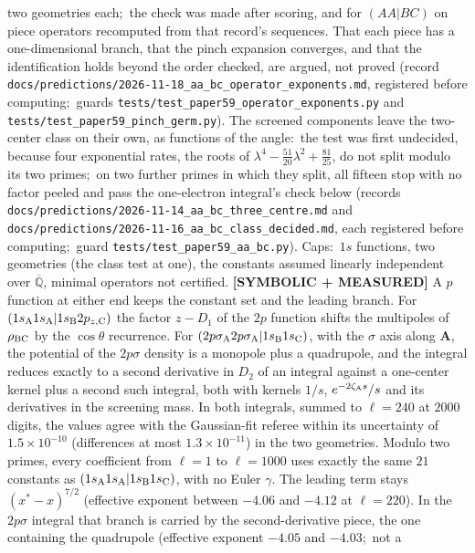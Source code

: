 \documentclass[aps,pra,twocolumn,superscriptaddress,longbibliography]{revtex4-2}
\begin{document}
two geometries each;\ the check was made after scoring, and for $(AA|BC)$ on piece operators
recomputed from that record's sequences.  That each piece has a one-dimensional branch, that the pinch expansion converges, and that
the identification holds beyond the order checked, are argued, not proved (record
\texttt{docs/predictions/2026-11-18\_aa\_bc\_operator\_exponents.md}, registered before computing;\ guards
\texttt{tests/test\_paper59\_operator\_exponents.py} and
\texttt{tests/test\_paper59\_pinch\_germ.py}).  The screened components leave the two-center class on their own, as functions of
the angle:\ the test was first undecided, because four exponential rates, the roots of
$\lambda^4-\tfrac{51}{20}\lambda^2+\tfrac{81}{25}$, do not split modulo its two primes;\ on two
further primes in which they split, all fifteen stop with no factor peeled and pass the
one-electron integral's check below (records
\texttt{docs/predictions/2026-11-14\_aa\_bc\_three\_centre.md} and
\texttt{docs/predictions/2026-11-16\_aa\_bc\_class\_decided.md}, each registered before
computing;\ guard \texttt{tests/test\_paper59\_aa\_bc.py}).  Caps:\ $1s$ functions, two
geometries (the class test at one), the constants assumed linearly independent over
$\overline{\mathbb{Q}}$, minimal operators not certified.
\textbf{[SYMBOLIC + MEASURED]} A $p$ function at either end keeps the constant set and the
leading branch.
For $(1s_{\rm A}1s_{\rm A}|1s_{\rm B}2p_{z,{\rm C}})$ the factor $z-D_1$ of the $2p$ function
shifts the multipoles of $\rho_{\rm BC}$ by the $\cos\theta$ recurrence.  For
$(2p\sigma_{\rm A}2p\sigma_{\rm A}|1s_{\rm B}1s_{\rm C})$, with the $\sigma$ axis along
$\mathbf{A}$, the potential of the $2p\sigma$ density is a monopole plus a quadrupole, and the
integral reduces exactly to a second derivative in $D_2$ of an integral against a one-center
kernel plus a second such integral, both with kernels $1/s$, $e^{-2\zeta_{\rm A}s}/s$ and its
derivatives in the screening mass.  In both integrals, summed to
$\ell=240$ at $2000$ digits, the values agree with the Gaussian-fit referee within its
uncertainty of $1.5\times10^{-10}$ (differences at most $1.3\times10^{-11}$) in
the two geometries.  Modulo two primes, every coefficient from $\ell=1$ to $\ell=1000$ uses exactly the
same $21$ constants as $(1s_{\rm A}1s_{\rm A}|1s_{\rm B}1s_{\rm C})$, with no Euler $\gamma$.  The
leading term stays $(x^{*}-x)^{7/2}$ (effective exponent between $-4.06$ and $-4.12$ at
$\ell=220$).  In the $2p\sigma$ integral that branch is carried by the second-derivative
piece, the one containing the quadrupole (effective exponent $-4.05$ and $-4.03$;\ not a
\end{document}
